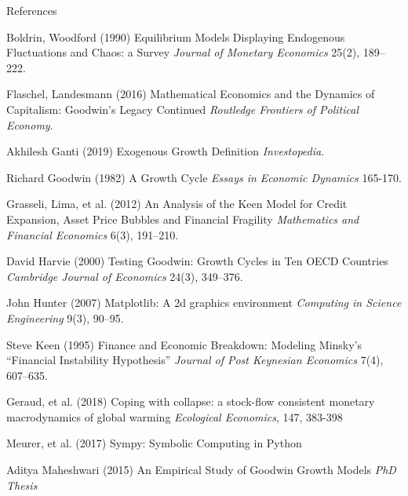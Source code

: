 \documentclass{beamer}
\begin{document}
\begin{frame}[allowframebreaks]{References}
\footnotesize{
\begin{thebibliography}{99} %

\scriptsize
{} Boldrin, Woodford (1990)
\newblock Equilibrium Models Displaying Endogenous Fluctuations and Chaos:  a Survey
\newblock \emph{Journal of Monetary Economics} 25(2), 189–222.

 Flaschel, Landesmann (2016)
\newblock Mathematical Economics and the Dynamics of Capitalism: Goodwin’s Legacy Continued
\newblock \emph{Routledge Frontiers of Political Economy}.

 Akhilesh Ganti (2019)
\newblock Exogenous Growth Definition
\newblock \emph{Investopedia}.

 Richard Goodwin (1982)
\newblock A Growth Cycle
\newblock \emph{Essays in Economic Dynamics} 165-170.

 Grasseli, Lima, et al. (2012)
\newblock An Analysis of the Keen Model for Credit Expansion, Asset Price Bubbles and Financial Fragility
\newblock \emph{Mathematics and Financial Economics} 6(3), 191–210.

 David Harvie (2000)
\newblock Testing Goodwin: Growth Cycles in Ten OECD Countries
\newblock \emph{Cambridge Journal of Economics} 24(3), 349–376.

 John Hunter (2007)
\newblock Matplotlib:  A 2d graphics environment
\newblock \emph{Computing in Science Engineering} 9(3), 90–95.

 Steve Keen (1995)
\newblock Finance and Economic Breakdown:  Modeling Minsky’s ``Financial Instability Hypothesis''
\newblock \emph{Journal of Post Keynesian Economics} 7(4), 607–635.

 Geraud, et al. (2018)
    \newblock Coping with collapse: a stock-flow consistent monetary macrodynamics of global warming
    \newblock \emph{Ecological Economics}, 147, 383-398

 Meurer, et al. (2017)
\newblock Sympy:  Symbolic Computing in Python

 Aditya Maheshwari (2015)
\newblock An Empirical Study of Goodwin Growth Models
\newblock \emph{PhD Thesis}


\end{thebibliography}}
\end{frame}
\end{document}
